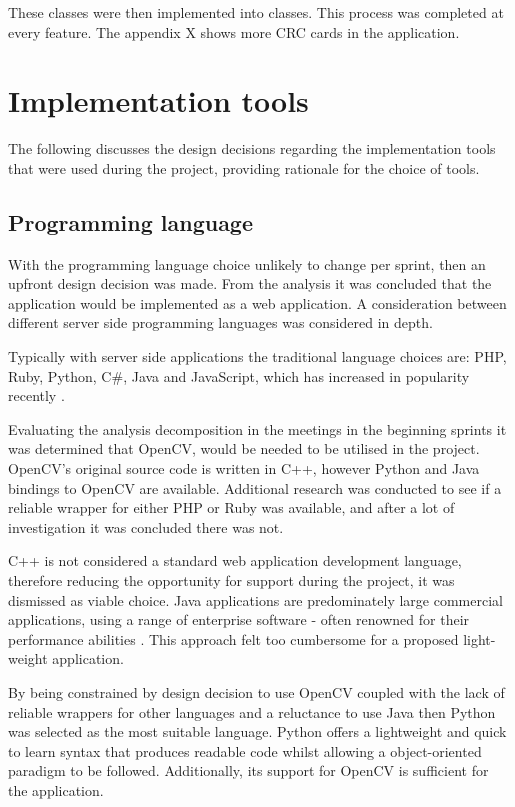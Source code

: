 These classes were then implemented into classes. This process was completed at every feature. The appendix X shows more CRC cards in the application.








\section{Implementation tools}
The following discusses the design decisions regarding the implementation tools that were used during the project, providing rationale for the choice of tools.
\subsection{Programming language}
With the programming language choice unlikely to change per sprint, then an upfront design decision was made. From the analysis it was concluded that the application would be implemented as a web application.  A consideration between different server side programming languages was considered in depth.

Typically with server side applications the traditional language choices are: PHP, Ruby, Python, C\#, Java and JavaScript, which has increased in popularity recently \cite{citeulike:14018462}.

Evaluating the analysis decomposition in the meetings in the beginning sprints it was determined that OpenCV, would be needed to be utilised in the project. OpenCV's original source code is written in C++, however Python and Java bindings to OpenCV are available. Additional research was conducted to see if a reliable wrapper for either PHP or Ruby was available, and after a lot of investigation it was concluded there was not.

C++ is not considered a standard web application development language, therefore reducing the opportunity for support during the project, it was dismissed as viable choice. Java applications are predominately large commercial applications, using a range of enterprise software - often renowned for their performance abilities \cite{citeulike:14019744}. This approach felt too cumbersome for a proposed light-weight application.

By being constrained by design decision to use OpenCV coupled with the lack of reliable wrappers for other languages and a reluctance to use Java then Python was selected as the most suitable language. Python offers a lightweight and quick to learn syntax that produces readable code whilst allowing a object-oriented paradigm to be followed. Additionally, its support for OpenCV is sufficient for the application.


